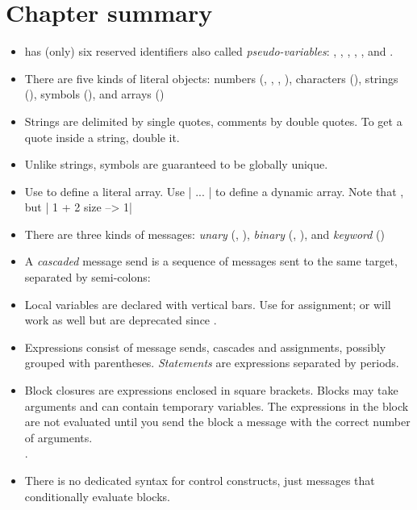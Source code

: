\documentclass[a4paper,10pt,twoside]{book}
\begin{document}
\section{Chapter summary}

\begin{itemize}

\item	\pharo has (only) six reserved identifiers also called \textit{pseudo-variables}: , , , , ,  and  .

\item	There are five kinds of literal objects: numbers (, , , ), characters (), strings (), symbols (), and arrays ()

\item	Strings are delimited by single quotes, comments by double quotes.
		To get a quote inside a string, double it.

\item	Unlike strings, symbols are guaranteed to be globally unique.

\item	Use  to define a literal array.
		Use \ct|{ ... }| to define a dynamic array.
		Note that 
		, but 
		\ct|{ 1 + 2 } size --> 1|

\item	There are three kinds of messages:
		\emph{unary} (\eg {}, ),
		\emph{binary} (\eg {}, ), and
		\emph{keyword} (\eg {})

\item	A \emph{cascaded} message send is a sequence of messages sent to the same target, separated by semi-colons:

\item	Local variables are declared with vertical bars.
		Use \ct{:=} for assignment; \ct{_} or  will work as well but are deprecated since .

\item	Expressions consist of message sends, cascades and assignments, possibly grouped with parentheses.
		\emph{Statements} are expressions separated by periods.

\item	Block closures are expressions enclosed in square brackets.
		Blocks may take arguments and can contain temporary variables.
		The expressions in the block are not evaluated until you send the block a 
		 message with the correct number of arguments.\\
		.

\item	There is no dedicated syntax for control constructs, just messages that conditionally evaluate blocks.\\

\end{itemize}

\ifx\wholebook\relax\else
\end{document}
